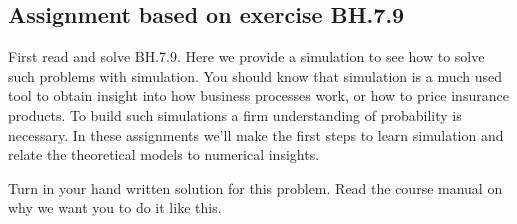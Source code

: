 \subsection{Assignment based on exercise BH.7.9}
\label{sec:bh.7.9}

First read and solve BH.7.9. Here we provide a simulation to see how to solve such problems with simulation. You should know that simulation is a much used tool to obtain insight into how business processes work, or how to price insurance products. To build such simulations a firm understanding of probability is necessary. In these assignments we'll make the first steps to learn simulation and relate the theoretical models to numerical insights.

\begin{exercise}
Turn in your hand written solution for this problem. Read the course manual  on why we want you to do it like this.
\end{exercise}


